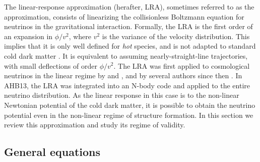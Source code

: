 \documentclass[useAMS, usenatbib]{mnras}
\begin{document}
The linear-response approximation (herafter, LRA), sometimes referred to as the \cite{Gilbert_1966} approximation, consists of linearizing the collisionless Boltzmann equation for neutrinos in the gravitational interaction. Formally, the LRA is the first order of an expansion in $\phi/v^2$, where $v^2$ is the variance of the velocity distribution. This implies that it is only well defined for \emph{hot} species, and is not adapted to standard cold dark matter \citep{YAH_15}. It is equivalent to assuming nearly-straight-line trajectories, with small deflections of order $\phi/v^2$. The LRA was first applied to cosmological neutrinos in the linear regime by \cite{Bond_Szalay_1983} and \cite{Brandenberger_1987}, and by several authors since then \citep{Singh_Ma_2003, Ringwald_Wong_2004}. In AHB13, the LRA was integrated into an N-body code and applied to the entire neutrino distribution. As the linear response in this case is to the non-linear Newtonian potential of the cold dark matter, it is possible to obtain the neutrino potential even in the non-linear regime of structure formation. In this section we review this approximation and study its regime of validity.

\subsection{General equations}
\end{document}
